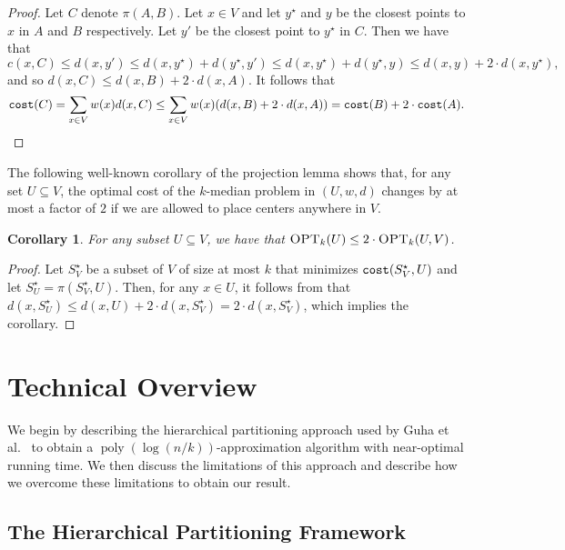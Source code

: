 \documentclass[11pt]{article}
\newcommand{\1}{\mathmybb{1}}
\newtheorem{corollary}[theorem]{Corollary}
\DeclareMathOperator*{\poly}{poly}
\newcommand{\proj}{\pi}
\newcommand{\OPT}{\textsc{OPT}}
\newcommand{\cost}{\textnormal{\texttt{cost}}}
\begin{document}
\begin{proof}
    Let $C$ denote $\proj(A,B)$. Let $x \in V$ and let $y^\star$ and $y$ be the closest points to $x$ in $A$ and $B$ respectively. Let $y'$ be the closest point to $y^\star$ in $C$. Then we have that
    $$ c(x,C) \leq d(x, y') \leq d(x, y^\star) + d(y^\star, y') \leq d(x, y^\star) + d(y^\star, y) \leq d(x, y) + 2 \cdot d(x, y^\star), $$
    and so $d(x, C) \leq d(x, B) + 2 \cdot d(x, A)$. It follows that 
    $$\cost(C) = \sum_{x \in V} w(x) d(x,C) \leq \sum_{x \in V} w(x) (d(x, B) + 2 \cdot d(x, A)) = \cost(B) + 2  \cdot \cost(A).\qedhere$$
\end{proof}


The following well-known corollary of the projection lemma shows that, for any set $U \subseteq V$, the optimal cost of the $k$-median problem in $(U,w,d)$ changes by at most a factor of $2$ if we are allowed to place centers anywhere in $V$.

\begin{corollary}\label{cor:improper}
    For any subset $U \subseteq V$, we have that $\OPT_k(U) \leq 2 \cdot \OPT_k(U,V)$.
\end{corollary}

\begin{proof}
    Let $S_V^\star$ be a subset of $V$ of size at most $k$ that minimizes $\cost(S_V^\star, U)$ and let $S_U^\star = \proj(S_V^\star, U)$. Then, for any $x \in U$, it follows from  that $d(x, S^\star_U) \leq d(x,U) + 2\cdot d(x, S^\star_V) = 2\cdot d(x, S^\star_V)$, which implies the corollary.
\end{proof}

 

\section{Technical Overview}\label{sec:tech}

We begin by describing the hierarchical partitioning approach used by Guha et al.~\cite{focs/GuhaMMO00} to obtain a $\poly(\log(n/k))$-approximation algorithm with near-optimal running time. We then discuss the limitations of this approach and describe how we overcome these limitations to obtain our result.

\subsection{The Hierarchical Partitioning Framework}
\end{document}
